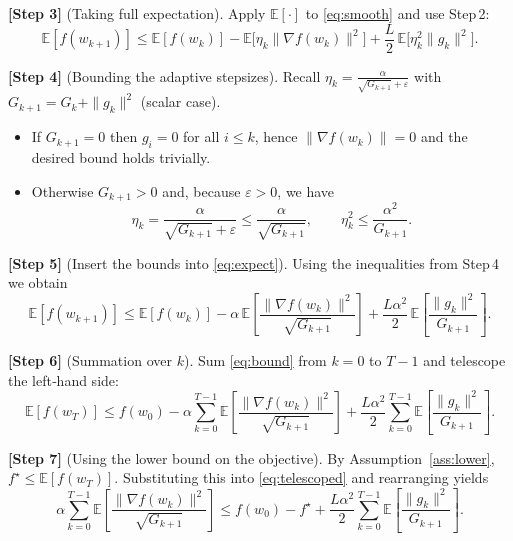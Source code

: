 \documentclass{article}
\begin{document}
\noindent\textbf{[Step 3]} (Taking full expectation).  
Apply $\mathbb{E}[\cdot]$ to \eqref{eq:smooth} and use Step 2:
\begin{equation}
\mathbb{E}[f(w_{k+1})]\le
\mathbb{E}[f(w_k)]-\mathbb{E}\big[\eta_k\|\nabla f(w_k)\|^{2}\big]
+\frac{L}{2}\,\mathbb{E}\big[\eta_k^{2}\|g_k\|^{2}\big]. \label{eq:expect}
\end{equation}

\noindent\textbf{[Step 4]} (Bounding the adaptive stepsizes).  
Recall $\displaystyle \eta_k=\frac{\alpha}{\sqrt{G_{k+1}}+\varepsilon}$ with $G_{k+1}=G_k+\|g_k\|^{2}$ (scalar case).  
\begin{itemize}
\item If $G_{k+1}=0$ then $g_i=0$ for all $i\le k$, hence $\|\nabla f(w_k)\|=0$ and the desired bound holds trivially.
\item Otherwise $G_{k+1}>0$ and, because $\varepsilon>0$, we have
\[
\eta_k
= \frac{\alpha}{\sqrt{G_{k+1}}+\varepsilon}
\le \frac{\alpha}{\sqrt{G_{k+1}}},\qquad
\eta_k^{2}\le \frac{\alpha^{2}}{G_{k+1}} .
\] 
\end{itemize}

\noindent\textbf{[Step 5]} (Insert the bounds into \eqref{eq:expect}).  
Using the inequalities from Step 4 we obtain
\begin{equation}
\mathbb{E}[f(w_{k+1})]\le
\mathbb{E}[f(w_k)]-
\alpha\,\mathbb{E}\!\left[\frac{\|\nabla f(w_k)\|^{2}}{\sqrt{G_{k+1}}}\right]
+\frac{L\alpha^{2}}{2}\,
\mathbb{E}\!\left[\frac{\|g_k\|^{2}}{G_{k+1}}\right].
\label{eq:bound}
\end{equation}

\noindent\textbf{[Step 6]} (Summation over $k$).  
Sum \eqref{eq:bound} from $k=0$ to $T-1$ and telescope the left‑hand side:
\begin{equation}
\mathbb{E}[f(w_T)]\le f(w_0)
-\alpha\sum_{k=0}^{T-1}\mathbb{E}\!\left[\frac{\|\nabla f(w_k)\|^{2}}{\sqrt{G_{k+1}}}\right]
+\frac{L\alpha^{2}}{2}\sum_{k=0}^{T-1}
\mathbb{E}\!\left[\frac{\|g_k\|^{2}}{G_{k+1}}\right].
\label{eq:telescoped}
\end{equation}

\noindent\textbf{[Step 7]} (Using the lower bound on the objective).  
By Assumption~\ref{ass:lower}, $f^{\star}\le\mathbb{E}[f(w_T)]$.  Substituting this into \eqref{eq:telescoped} and rearranging yields
\begin{equation}
\alpha\sum_{k=0}^{T-1}\mathbb{E}\!\left[\frac{\|\nabla f(w_k)\|^{2}}{\sqrt{G_{k+1}}}\right]
\le
f(w_0)-f^{\star}
+\frac{L\alpha^{2}}{2}\sum_{k=0}^{T-1}
\mathbb{E}\!\left[\frac{\|g_k\|^{2}}{G_{k+1}}\right].
\label{eq:prelim}
\end{equation}
\end{document}
